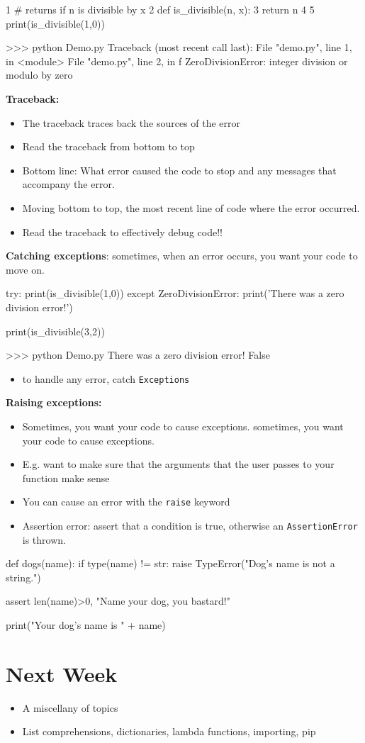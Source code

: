 \documentclass[12pt]{article}
\numberwithin{equation}{section}
\begin{document}
\begin{python}
1 # returns if n is divisible by x
2 def is_divisible(n, x):
3 	return n%
4 
5 print(is_divisible(1,0))

>>> python Demo.py
Traceback (most recent call last):
  File "demo.py", line 1, in <module>
  File "demo.py", line 2, in f
ZeroDivisionError: integer division or modulo by zero
\end{python}

\textbf{Traceback:}
\begin{itemize}
    \item The traceback traces back the sources of the error
    \item Read the traceback from bottom to top
    \item Bottom line: What error caused the code to stop and any messages that accompany the error. 
    \item Moving bottom to top, the most recent line of code where the error occurred.
    \item Read the traceback to effectively debug code!!
\end{itemize}

\textbf{Catching exceptions}: sometimes, when an error occurs, you want your code to move on.
\begin{python}
try:
    print(is_divisible(1,0))
except ZeroDivisionError:
    print('There was a zero division error!')

print(is_divisible(3,2))

>>> python Demo.py
There was a zero division error! 
False
\end{python}
\begin{itemize}
    \item to handle any error, catch \verb|Exceptions|
\end{itemize}

\textbf{Raising exceptions: }
\begin{itemize}
    \item Sometimes, you want your code to cause exceptions.
sometimes, you want your code to cause exceptions.
    \item E.g. want to make sure that the arguments that the user passes to your function make sense
    \item You can cause an error with the \verb|raise| keyword
    \item Assertion error: assert that a condition is true, otherwise an \verb|AssertionError| is thrown.
\end{itemize}
\begin{python}
def dogs(name):
    if type(name) != str:
        raise TypeError("Dog's name is not a string.")
    
    assert len(name)>0, "Name your dog, you bastard!"
    
    print("Your dog's name is " + name)
\end{python}

\section{Next Week}
\begin{itemize}
    \item A miscellany of topics
    \item List comprehensions, dictionaries, lambda functions, importing, pip
\end{itemize}
\end{document}
